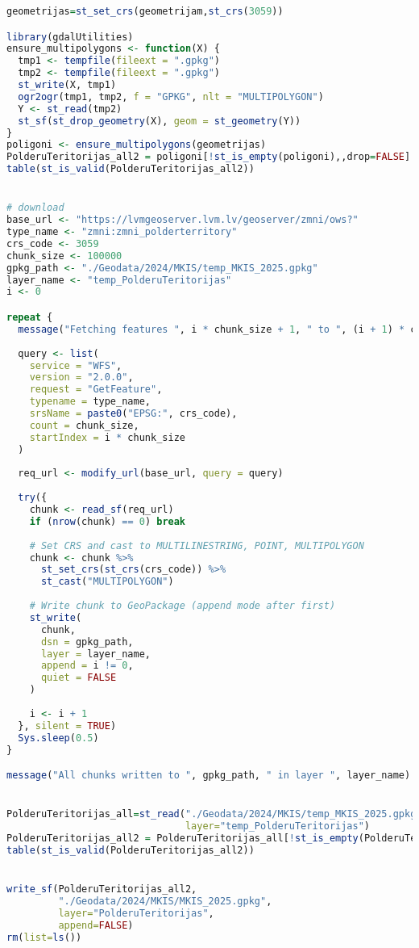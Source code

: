 \documentclass[
]{book}
\begin{document}
\begin{lstlisting}[language=R]
geometrijas=st_set_crs(geometrijam,st_crs(3059))

library(gdalUtilities)
ensure_multipolygons <- function(X) {
  tmp1 <- tempfile(fileext = ".gpkg")
  tmp2 <- tempfile(fileext = ".gpkg")
  st_write(X, tmp1)
  ogr2ogr(tmp1, tmp2, f = "GPKG", nlt = "MULTIPOLYGON")
  Y <- st_read(tmp2)
  st_sf(st_drop_geometry(X), geom = st_geometry(Y))
}
poligoni <- ensure_multipolygons(geometrijas)
PolderuTeritorijas_all2 = poligoni[!st_is_empty(poligoni),,drop=FALSE] # 0
table(st_is_valid(PolderuTeritorijas_all2))


# download
base_url <- "https://lvmgeoserver.lvm.lv/geoserver/zmni/ows?"
type_name <- "zmni:zmni_polderterritory"
crs_code <- 3059
chunk_size <- 100000
gpkg_path <- "./Geodata/2024/MKIS/temp_MKIS_2025.gpkg"
layer_name <- "temp_PolderuTeritorijas"
i <- 0

repeat {
  message("Fetching features ", i * chunk_size + 1, " to ", (i + 1) * chunk_size, "...")
  
  query <- list(
    service = "WFS",
    version = "2.0.0",
    request = "GetFeature",
    typename = type_name,
    srsName = paste0("EPSG:", crs_code),
    count = chunk_size,
    startIndex = i * chunk_size
  )
  
  req_url <- modify_url(base_url, query = query)
  
  try({
    chunk <- read_sf(req_url)
    if (nrow(chunk) == 0) break
    
    # Set CRS and cast to MULTILINESTRING, POINT, MULTIPOLYGON
    chunk <- chunk %>%
      st_set_crs(st_crs(crs_code)) %>%
      st_cast("MULTIPOLYGON")
    
    # Write chunk to GeoPackage (append mode after first)
    st_write(
      chunk, 
      dsn = gpkg_path,
      layer = layer_name,
      append = i != 0,
      quiet = FALSE
    )
    
    i <- i + 1
  }, silent = TRUE)
  Sys.sleep(0.5)
}

message("All chunks written to ", gpkg_path, " in layer ", layer_name)


PolderuTeritorijas_all=st_read("./Geodata/2024/MKIS/temp_MKIS_2025.gpkg",
                               layer="temp_PolderuTeritorijas")
PolderuTeritorijas_all2 = PolderuTeritorijas_all[!st_is_empty(PolderuTeritorijas_all),,drop=FALSE] # 0
table(st_is_valid(PolderuTeritorijas_all2))


write_sf(PolderuTeritorijas_all2,
         "./Geodata/2024/MKIS/MKIS_2025.gpkg",
         layer="PolderuTeritorijas",
         append=FALSE)
rm(list=ls())



\end{lstlisting}
\end{document}
